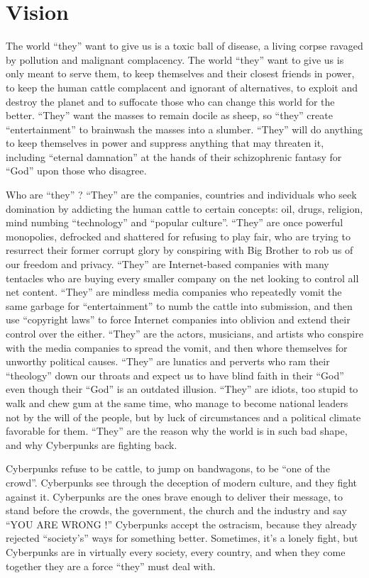 \documentclass[letterpaper,12pt,english]{sphinxmanual}
\begin{document}
\section{Vision}
\label{2007:vision}
The world ``they'' want to give us is a toxic ball of disease, a living corpse ravaged by pollution and malignant complacency. The world ``they'' want to give us is only meant to serve them, to keep themselves and their closest friends in power, to keep the human cattle complacent and ignorant of alternatives, to exploit and destroy the planet and to suffocate those who can change this world for the better. ``They'' want the masses to remain docile as sheep, so ``they'' create ``entertainment'' to brainwash the masses into a slumber. ``They'' will do anything to keep themselves in power and suppress anything that may threaten it, including ``eternal damnation'' at the hands of their schizophrenic fantasy for ``God'' upon those who disagree.

Who are ``they'' ? ``They'' are the companies, countries and individuals who seek domination by addicting the human cattle to certain concepts: oil, drugs, religion, mind numbing ``technology'' and ``popular culture''. ``They'' are once powerful monopolies, defrocked and shattered for refusing to play fair, who are trying to resurrect their former corrupt glory by conspiring with Big Brother to rob us of our freedom and privacy. ``They'' are Internet-based companies with many tentacles who are buying every smaller company on the net looking to control all net content. ``They'' are mindless media companies who repeatedly vomit the same garbage for ``entertainment'' to numb the cattle into submission, and then use ``copyright laws'' to force Internet companies into oblivion and extend their control over the either. ``They'' are the actors, musicians, and artists who conspire with the media companies to spread the vomit, and then whore themselves for unworthy political causes. ``They'' are lunatics and perverts who ram their ``theology'' down our throats and expect us to have blind faith in their ``God'' even though their ``God'' is an outdated illusion. ``They'' are idiots, too stupid to walk and chew gum at the same time, who manage to become national leaders not by the will of the people, but by luck of circumstances and a political climate favorable for them. ``They'' are the reason why the world is in such bad shape, and why Cyberpunks are fighting back.

Cyberpunks refuse to be cattle, to jump on bandwagons, to be ``one of the crowd''. Cyberpunks see through the deception of modern culture, and they fight against it. Cyberpunks are the ones brave enough to deliver their message, to stand before the crowds, the government, the church and the industry and say ``YOU ARE WRONG !'' Cyberpunks accept the ostracism, because they already rejected ``society's'' ways for something better. Sometimes, it's a lonely fight, but Cyberpunks are in virtually every society, every country, and when they come together they are a force ``they'' must deal with.
\end{document}
